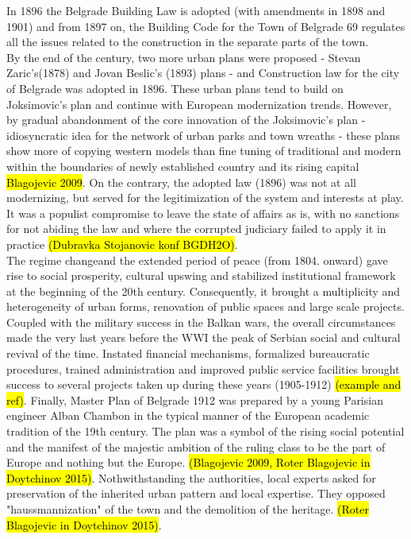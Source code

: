 \documentclass[11pt]{report}
\begin{document}
In 1896 the Belgrade Building Law is adopted (with amendments in 1898 and 1901) and from 1897 on, the Building Code for the Town of Belgrade 69  regulates all the issues related to the construction in the separate parts of the town.
\\
By the end of the century, two more urban plans were proposed - Stevan Zaric's(1878) and Jovan Beslic's (1893) plans - and Construction law for the city of Belgrade was adopted in 1896. These urban plans tend to build on Joksimovic's plan and continue with European modernization trends. However, by gradual abandonment of the core innovation of the Joksimovic's plan - idiosyncratic idea for the network of urban parks  and town wreaths - these plans show more of copying western models than fine tuning of traditional and modern within the boundaries of newly established country and its rising capital \hl{Blagojevic 2009}. On the contrary, the adopted law (1896) was not at all modernizing, but served for the legitimization of the system and interests at play. It was a populist compromise to leave the state of affairs as is, with no sanctions for not abiding the law and where the corrupted judiciary failed to apply it in practice \hl{(Dubravka Stojanovic konf BGDH2O)}. 
\\
The regime change\footnotemark and the extended period of peace (from 1804. onward) gave rise to social prosperity, cultural upswing and stabilized institutional framework at the beginning of the 20th century. Consequently, it brought a multiplicity and heterogeneity of urban forms, renovation of public spaces and large scale projects. Coupled with the military success in the Balkan wars, the overall circumstances made the very last years before the WWI the peak of Serbian social and cultural revival of the time. Instated financial mechanisms, formalized bureaucratic procedures, trained administration and improved public service facilities brought success to several projects taken up during these years (1905-1912) \hl{(example and ref)}. Finally, Master Plan of  Belgrade 1912 was prepared by a young Parisian engineer Alban Chambon in the typical manner of the European academic tradition of the 19th century. The plan was a symbol of the rising social potential and the manifest of the majestic ambition of the ruling class to be the part of Europe and nothing but the Europe. 
\hl{(Blagojevic 2009, Roter Blagojevic in Doytchinov 2015)}. Nothwithstanding the authorities, local experts asked for preservation of the inherited urban pattern and local expertise. They opposed "haussmannization" of the town and the demolition of the heritage. \hl{(Roter Blagojevic in Doytchinov 2015)}.
\end{document}
